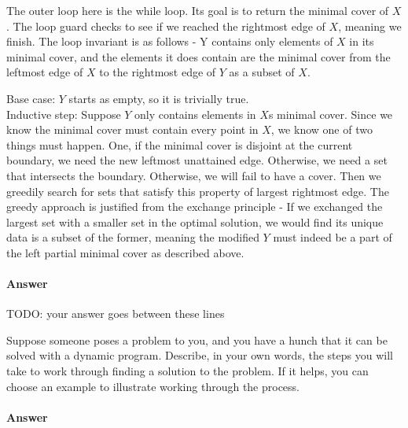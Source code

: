 \documentclass{article}
\begin{document}
\begin{enumerate}
		The outer loop here is the while loop. Its goal is to return
		the minimal cover of $X$. The loop guard checks to see if we
		reached the rightmost edge of $X$, meaning we finish. The loop
		invariant is as follows - Y contains only elements of $X$ in 
		its minimal cover, and the elements it does contain are the 
		minimal cover from the leftmost edge of $X$ to the rightmost 
		edge of $Y$ as a subset of $X$. 

		Base case: $Y$ starts as empty, so it is trivially true.\\
		Inductive step: Suppose $Y$ only contains elements in $X$s minimal cover. Since we know the minimal cover must contain every point in $X$, we know one of two things must happen. One, if the minimal cover is disjoint at the current boundary, we need the new leftmost unattained edge. Otherwise, we need a set that intersects the boundary. Otherwise, we will fail to have a cover. Then
		we greedily search for sets that satisfy this property of largest rightmost edge. The greedy approach is justified from the exchange principle - If we exchanged the largest set with a smaller set in the optimal solution, we would find its unique data is a subset of the former, meaning
		the modified $Y$  must indeed be a part of the left partial minimal cover as
		described above. 
\end{enumerate}



\paragraph{Answer}

TODO: your answer goes between these lines


\nextprob
{}

Suppose someone poses a problem to you, and you have a hunch that it can be
solved with a dynamic program.  Describe, in your own words, the steps you will
take to work through finding a solution to the problem.  If it helps, you can
choose an example to illustrate working through the process.

\paragraph{Answer}

\end{document}
